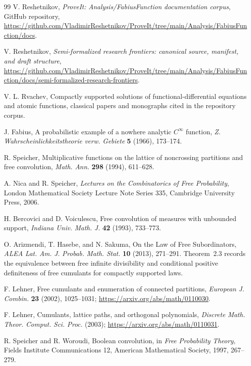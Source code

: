 \documentclass[11pt]{article}
\theoremstyle{definition}
\begin{document}
\begin{thebibliography}{99}
V. Reshetnikov,
\emph{ProveIt: Analysis/FabiusFunction documentation corpus},
GitHub repository,
\url{https://github.com/VladimirReshetnikov/ProveIt/tree/main/Analysis/FabiusFunction/docs}.

V. Reshetnikov,
\emph{Semi-formalized research frontiers: canonical source, manifest, and draft structure},
\url{https://github.com/VladimirReshetnikov/ProveIt/tree/main/Analysis/FabiusFunction/docs/semi-formalized-research-frontiers}.

V. L. Rvachev,
Compactly supported solutions of functional-differential equations and atomic functions,
classical papers and monographs cited in the repository corpus.

J. Fabius,
A probabilistic example of a nowhere analytic \(C^\infty\) function,
\emph{Z. Wahrscheinlichkeitstheorie verw. Gebiete} \textbf{5} (1966), 173--174.

R. Speicher,
Multiplicative functions on the lattice of noncrossing partitions and free convolution,
\emph{Math. Ann.} \textbf{298} (1994), 611--628.

A. Nica and R. Speicher,
\emph{Lectures on the Combinatorics of Free Probability},
London Mathematical Society Lecture Note Series 335, Cambridge University Press, 2006.

H. Bercovici and D. Voiculescu,
Free convolution of measures with unbounded support,
\emph{Indiana Univ. Math. J.} \textbf{42} (1993), 733--773.

O. Arizmendi, T. Hasebe, and N. Sakuma,
On the Law of Free Subordinators,
\emph{ALEA Lat. Am. J. Probab. Math. Stat.} \textbf{10} (2013), 271--291.
Theorem~2.3 records the equivalence between free infinite divisibility and conditional positive definiteness of free cumulants for compactly supported laws.

F. Lehner,
Free cumulants and enumeration of connected partitions,
\emph{European J. Combin.} \textbf{23} (2002), 1025--1031;
\url{https://arxiv.org/abs/math/0110030}.

F. Lehner,
Cumulants, lattice paths, and orthogonal polynomials,
\emph{Discrete Math. Theor. Comput. Sci. Proc.} (2003);
\url{https://arxiv.org/abs/math/0110031}.

R. Speicher and R. Woroudi,
Boolean convolution,
in \emph{Free Probability Theory}, Fields Institute Communications 12,
American Mathematical Society, 1997, 267--279.


\end{thebibliography}
\end{document}
